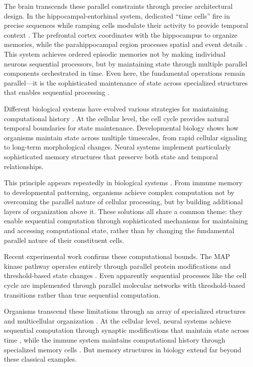 \documentclass[12pt]{article}
\begin{document}
The brain transcends these parallel constraints through precise architectural design.
In the hippocampal-entorhinal system, dedicated ``time cells'' fire in precise sequences while ramping cells modulate their activity to provide temporal context \cite{quentin2019differential}.
The prefrontal cortex coordinates with the hippocampus to organize memories, while the parahippocampal region processes spatial and event details \cite{martini2015information}.
This system achieves ordered episodic memories not by making individual neurons sequential processors, but by maintaining state through multiple parallel components orchestrated in time.
Even here, the fundamental operations remain parallel---it is the sophisticated maintenance of state across specialized structures that enables sequential processing \cite{bruno2022epigenetic}.

Different biological systems have evolved various strategies for maintaining computational history \cite{espinosa2024molecular}.
At the cellular level, the cell cycle provides natural temporal boundaries for state maintenance.
Developmental biology shows how organisms maintain state across multiple timescales, from rapid cellular signaling to long-term morphological changes.
Neural systems implement particularly sophisticated memory structures that preserve both state and temporal relationships.

This principle appears repeatedly in biological systems \cite{fu2024memory}.
From immune memory to developmental patterning, organisms achieve complex computation not by overcoming the parallel nature of cellular processing, but by building additional layers of organization above it.
These solutions all share a common theme: they enable sequential computation through sophisticated mechanisms for maintaining and accessing computational state, rather than by changing the fundamental parallel nature of their constituent cells.

Recent experimental work confirms these computational bounds.
The MAP kinase pathway operates entirely through parallel protein modifications and threshold-based state changes \cite{alberts2022molecular}.
Even apparently sequential processes like the cell cycle are implemented through parallel molecular networks with threshold-based transitions rather than true sequential computation.

Organisms transcend these limitations through an array of specialized structures and multicellular organization \cite{espinosa2024molecular}.
At the cellular level, neural systems achieve sequential computation through synaptic modifications that maintain state across time \cite{fu2024memory}, while the immune system maintains computational history through specialized memory cells \cite{niu2022computational}.
But memory structures in biology extend far beyond these classical examples.
\end{document}
